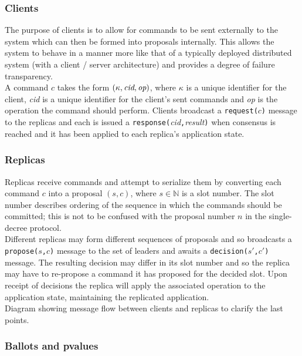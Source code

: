 \subsubsection{Clients}

The purpose of clients is to allow for commands to be sent externally to the system which can then be formed into proposals internally. This allows the system to behave in a manner more like that of a typically deployed distributed system (with a client / server architecture) and provides a degree of failure transparency. \\

A command $c$ takes the form $\left( \kappa, \mathrm{\emph{cid}}, \mathrm{\emph{op}} \right)$, where $\kappa$ is a unique identifier for the client, \emph{cid} is a unique identifier for the client's sent commands and \emph{op} is the operation the command should perform. Clients broadcast a \texttt{request($c$)} message to the replicas and each is issued a \texttt{response(}\emph{cid}\texttt{,}\emph{result}\texttt{)} when consensus is reached and it has been applied to each replica's application state.


\subsubsection{Replicas}

Replicas receive commands and attempt to serialize them by converting each command $c$ into a proposal $\left(s,c\right)$, where $s \in \mathbb{N}$ is a slot number. The slot number describes ordering of the sequence in which the commands should be committed; this is not to be confused with the proposal number $n$ in the single-decree protocol. \\

Different replicas may form different sequences of proposals and so broadcasts a \texttt{propose($s$,$c$)} message to the set of leaders and awaits a \texttt{decision($s'$,$c'$)} message. The resulting decision may differ in its slot number and so the replica may have to re-propose a command it has proposed for the decided slot. Upon receipt of decisions the replica will apply the associated operation to the application state, maintaining the replicated application. \\

{\color{blue}Diagram showing message flow between clients and replicas to clarify the last points.}

\subsubsection{Ballots and pvalues}

